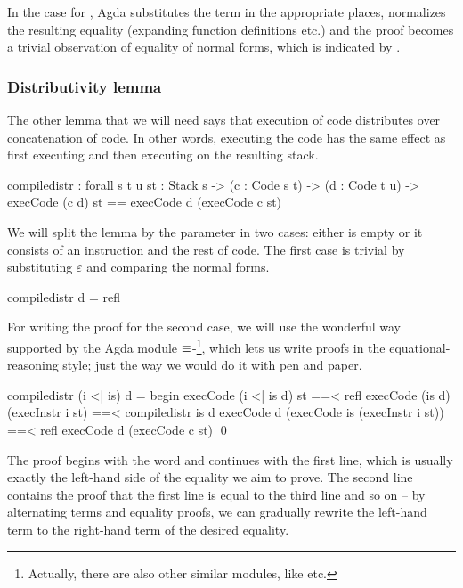 \noindent In the case for , Agda substitutes the term 
in the appropriate places, normalizes the resulting equality (expanding
function definitions etc.) and the proof becomes a trivial observation of
equality of normal forms, which is indicated by .

\subsubsection{Distributivity lemma}

The other lemma that we will need says that execution of code distributes over
concatenation of code. In other words, executing the code  has the same effect as first executing  and then executing
 on the resulting stack.

\begin{code}
  compile\-distr : forall {s t u} {st : Stack s}
    -> (c : Code s t) -> (d : Code t u)
    -> execCode (c \app d) st == execCode d (execCode c st)
\end{code}

\noindent We will split the lemma by the parameter  in two cases:
either  is empty or it consists of an instruction and the rest of
code. The first case is trivial by substituting $\varepsilon$ and comparing the
normal forms.

\begin{code}
  compile\-distr \nil d = refl
\end{code}

\noindent For writing the proof for the second case, we will use the wonderful
way supported by the Agda module $\mathsf{\equiv}$-\footnote{Actually,
there are also other similar modules, like  etc.}, which
lets us write proofs in the equational-reasoning style; just the way we would
do it with pen and paper.

\begin{code}
  compile\-distr (i <| is) d = begin
    execCode (i <| is \app d) st
      ==< refl \>
    execCode (is \app d) (execInstr i st)
      ==< compile\-distr is d \>
    execCode d (execCode is (execInstr i st))
      ==< refl \>
    execCode d (execCode c st)
    \qed
\end{code}

\noindent The proof begins with the word  and continues with the
first line, which is usually exactly the left-hand side of the equality we aim
to prove.  The second line contains the proof that the first line is equal to
the third line and so on -- by alternating terms and equality proofs, we can
gradually rewrite the left-hand term to the right-hand term of the desired
equality.


